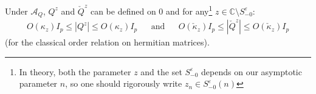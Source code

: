 \documentclass[a4papaer, titlepage]{book}
\begin{document}


\begin{lemma}\label{lem:Borne_resolvante}
  Under $\mathcal A_Q$, $Q^z$ and $\check Q^z$ can be defined on $0$ and for any\footnote{In theory, both the parameter $z$ and the set $S_{-0}^\varepsilon$ depends on our asymptotic parameter $n$, so one should rigorously write $z_n \in S_{-0}^\varepsilon(n)$} $z \in \mathbb C \setminus S_{-0}^\varepsilon$:
\begin{align*}
  O \left(\kappa_z\right) I_p \leq |Q^z| \leq O \left(\kappa_z\right)I_p&
  &\text{and}&
  &O \left(\check \kappa_z\right) I_p \leq |\check Q^z| \leq O \left(\check \kappa_z\right)I_p
\end{align*}
(for the classical order relation on hermitian matrices).
\end{lemma}
\end{document}
